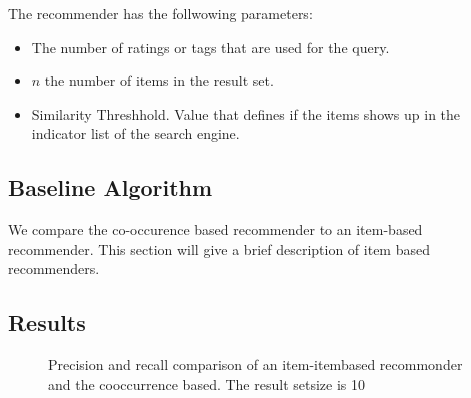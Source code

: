 The recommender has the follwowing parameters:
\begin{itemize}
\item The number of ratings or tags that are used for the query.
\item $n$ the number of items in the result set.
\item Similarity Threshhold. Value that defines if the items shows up in the indicator list of the search engine.
\end{itemize}

\subsection{Baseline Algorithm}
\label{sec:baselinealgorithm}

We compare the co-occurence based recommender to an item-based recommender. This section will give a brief description of item based recommenders.

\subsection{Results}
\label{sec:results}
\begin{figure}
  \centering
{} 
  \caption{Precision and recall comparison of an item-itembased recommonder and the cooccurrence based. The result setsize is 10}
  \label{fig:results}
\end{figure}
